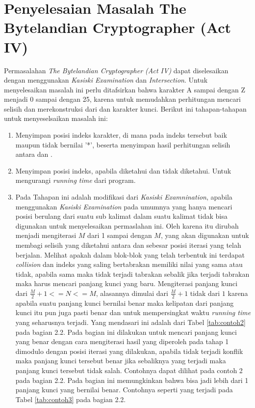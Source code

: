 	\section{Penyelesaian Masalah The Bytelandian Cryptographer (Act IV)}
	\label{chapter:solving}
	Permasalahan \textit{The Bytelandian Cryptographer (Act IV)} dapat diselesaikan dengan menggunakan \textit{Kasiski Examination} dan \textit{Intersection}. Untuk menyelesaikan masalah ini perlu ditafsirkan bahwa karakter A sampai dengan Z menjadi 0 sampai dengan 25, karena untuk memudahkan perhitungan mencari selisih dan merekonstruksi \plaintext dari \ciphertext dan karakter kunci. Berikut ini tahapan-tahapan untuk menyeselsaikan masalah ini:
	\begin{enumerate}
	\item Menyimpan posisi indeks karakter, di mana pada indeks tersebut baik \ciphertext maupun \plaintext tidak bernilai '*', beserta menyimpan hasil perhitungan selisih antara \ciphertext dan \plaintext\cite{john_jones_spoj_2009}.
	\item Menyimpan posisi indeks, apabila  \ciphertext diketahui dan \plaintext tidak diketahui. Untuk mengurangi \textit{running time} dari program\cite{john_jones_spoj_2009}.
	\item Pada Tahapan ini adalah modifikasi dari \textit{Kasiski Examnination}, apabila menggunakan \textit{Kasiski Examination} pada umumnya yang hanya mencari posisi berulang dari suatu sub kalimat dalam suatu kalimat tidak bisa digunakan untuk menyelesaikan permaslahan ini. Oleh karena itu dirubah menjadi mengiterasi $M$ dari 1 sampai dengan $M$, yang akan digunakan untuk membagi selisih yang diketahui antara \plaintext dan \ciphertext sebesar posisi iterasi yang telah berjalan. Melihat apakah dalam blok-blok yang telah terbentuk ini terdapat \textit{collision} dan indeks yang saling bertabrakan memiliki nilai yang sama atau tidak, apabila sama maka tidak terjadi tabrakan sebalik jika terjadi tabrakan maka harus mencari panjang kunci yang baru. Mengiterasi panjang kunci dari $\frac{M}{2}+1<=N<=M$, alasannya dimulai dari $\frac{M}{2}+1$ tidak dari $1$ karena apabila suatu panjang kunci bernilai benar maka kelipatan dari panjang kunci itu pun juga pasti benar dan untuk mempersingkat waktu \textit{running time} yang seharusnya terjadi. Yang mendasari ini adalah dari Tabel  \ref{tab:contoh2} pada bagian 2.2. Pada bagian ini dilakukan untuk mencari panjang kunci yang benar dengan cara mengiterasi hasil yang diperoleh pada tahap 1 dimodulo dengan posisi iterasi yang dilakukan, apabila tidak terjadi konflik maka panjang kunci tersebut benar jika sebaliknya yang terjadi maka panjang kunci tersebut tidak salah. Contohnya dapat dilihat pada contoh 2 pada bagian 2.2. Pada bagian ini memungkinkan bahwa bisa jadi lebih dari 1 panjang kunci yang bernilai benar. Contohnya seperti yang terjadi pada Tabel \ref{tab:contoh3} pada bagian 2.2. 

\end{enumerate}

